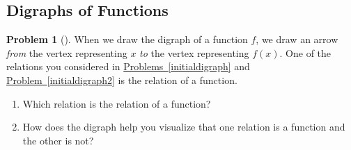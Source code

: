 \documentclass[10pt,]{book}
\theoremstyle{plain}
\theoremstyle{definition}
\newtheorem{activity}[project]{Problem}
\theoremstyle{definition}
\numberwithin{equation}{chapter}
\begin{document}
\subsection[{Digraphs of Functions}]{Digraphs of Functions}\label{digraphsoffunctions}
\begin{activity}[]\marginsymbol[-1em]{} \label{activity-336}
When we draw the digraph of a function \(f\), we draw an arrow \emph{from} the vertex representing \(x\) \emph{to} the vertex representing \(f(x)\).  One of the relations you considered in \hyperref[initialdigraph]{Problems~\ref{initialdigraph}} and \hyperref[initialdigraph2]{Problem~\ref{initialdigraph2}} is the relation of a function.%
\begin{enumerate}[font=\bfseries,label=(\alph*),ref=\alph*]
\item\label{task-244} \marginsymbol[-2.5em]{} Which relation is the relation of a function?%
\item\label{task-245} \marginsymbol[-2.5em]{} How does the digraph help you visualize that one relation is a function and the other is not?%
\end{enumerate}
\end{activity}
\end{document}
